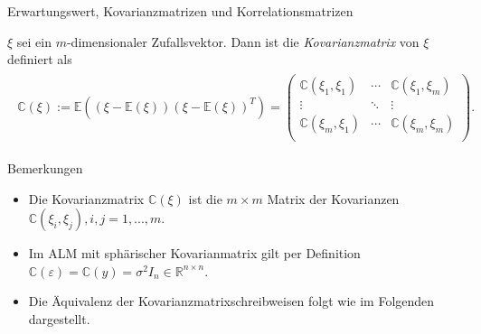 \documentclass[
  8pt,
  ignorenonframetext,
]{beamer}
\providecommand{\tightlist}{%
  \setlength{\itemsep}{0pt}\setlength{\parskip}{0pt}}
\begin{document}
\begin{frame}{Erwartungswert, Kovarianzmatrizen und
Korrelationsmatrizen}
\protect\hypertarget{erwartungswert-kovarianzmatrizen-und-korrelationsmatrizen-2}{}
\small
\begin{definition}[Kovarianzmatrix]
\justifying
$\xi$ sei ein $m$-dimensionaler Zufallsvektor. Dann ist die \textit{Kovarianzmatrix}
von $\xi$ definiert als
\begin{align}
\begin{split}
\mathbb{C}(\xi)
:= \mathbb{E}\left((\xi - \mathbb{E}(\xi))(\xi - \mathbb{E}(\xi))^T \right)
 =
\begin{pmatrix}
\mathbb{C}(\xi_1,\xi_1) & \cdots & \mathbb{C}(\xi_1,\xi_m) \\
\vdots              & \ddots & \vdots            \\
\mathbb{C}(\xi_m,\xi_1) & \cdots & \mathbb{C}(\xi_m,\xi_m) \\
\end{pmatrix}.
\end{split}
\end{align}
\end{definition}
\footnotesize

Bemerkungen

\begin{itemize}
\tightlist
\item
  Die Kovarianzmatrix \(\mathbb{C}(\xi)\) ist die \(m \times m\) Matrix
  der Kovarianzen \(\mathbb{C}(\xi_i,\xi_j), i,j = 1,...,m\).
\item
  Im ALM mit sphärischer Kovarianmatrix gilt per Definition
  \(\mathbb{C}(\varepsilon) = \mathbb{C}(y) = \sigma^2 I_n \in \mathbb{R}^{n \times n}\).
\item
  Die Äquivalenz der Kovarianzmatrixschreibweisen folgt wie im Folgenden
  dargestellt.
\end{itemize}
\end{frame}
\end{document}
